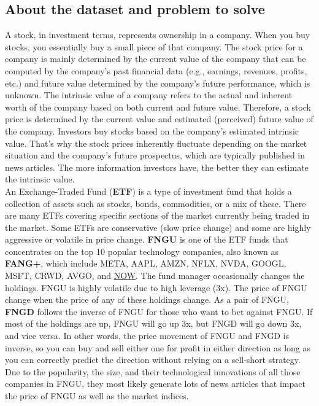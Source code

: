 \documentclass[twocolumn,12pt]{article}
\begin{document}
\begin{flushleft}
\subsection*{About the dataset and problem to solve}
A stock, in investment terms, represents ownership in a company. When you buy stocks, you essentially buy a small piece of that company. The stock price for a company is mainly determined by the current value of the company that can be computed by the company’s past financial data (e.g., earnings, revenues, profits, etc.) and future value determined by the company’s future performance, which is unknown. The intrinsic value of a company refers to the actual and inherent worth of the company based on both current and future value. Therefore, a stock price is determined by the current value and estimated (perceived) future value of the company. Investors buy stocks based on the company’s estimated intrinsic value. That’s why the stock prices inherently fluctuate depending on the market situation and the company’s future prospectus, which are typically published in news articles. The more information investors have, the better they can estimate the intrinsic value.\\
An Exchange-Traded Fund (\textbf{ETF}) is a type of investment fund that holds a collection of assets such as stocks, bonds, commodities, or a mix of these. There are many ETFs covering specific sections of the market currently being traded in the market. Some ETFs are conservative (slow price change) and some are highly aggressive or volatile in price change. \textbf{FNGU} is one of the ETF funds that concentrates on the top 10 popular technology companies, also known as \textbf{FANG+}, which include META, AAPL, AMZN, NFLX, NVDA, GOOGL, MSFT, CRWD, AVGO, and \href{https://finance.yahoo.com/quote/FNGU/holdings/}{NOW}. The fund manager occasionally changes the holdings. FNGU is highly volatile due to high leverage (3x). The price of FNGU change when the price of any of these holdings change. As a pair of FNGU, \textbf{FNGD} follows the inverse of FNGU for those who want to bet against FNGU. If most of the holdings are up, FNGU will go up 3x, but FNGD will go down 3x, and vice versa. In other words, the price movement of FNGU and FNGD is inverse, so you can buy and sell either one for profit in either direction as long as you can correctly predict the direction without relying on a sell-short strategy. Due to the popularity, the size, and their technological innovations of all those companies in FNGU, they most likely generate lots of news articles that impact the price of FNGU as well as the market indices.\\

\end{flushleft}
\end{document}
